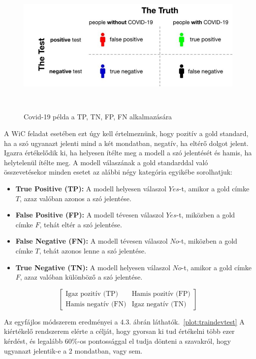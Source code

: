 \documentclass[12pt]{report}
\theoremstyle{definition}
\begin{document}
\begin{figure}[H]
	\centering
	\includegraphics[width=1\linewidth]{graphics/covid-tp-tn-fp-fn.png}
	\caption{Covid-19 példa a TP, TN, FP, FN alkalmazására}~\cite{manrai2020covid}
	\label{fig:enter-label3}
\end{figure}

A WiC feladat esetében ezt úgy kell értelmeznünk, hogy pozitív a gold standard, ha a szó ugyanazt jelenti mind a két mondatban, negatív, ha eltérő dolgot jelent. Igazra értékelődik ki, ha helyesen ítélte meg a modell a szó jelentését és hamis, ha helytelenül ítélte meg. A modell válaszának a gold standarddal való összevetésekor minden esetet az alábbi négy kategória egyikébe sorolhatjuk:
\begin{itemize}
	\item \textbf{True Positive (TP):} A modell helyesen válaszol $Yes$-t, amikor a gold címke $T$, azaz valóban azonos a szó jelentése.
	\item \textbf{False Positive (FP):} A modell tévesen válaszol $Yes$-t, miközben a gold címke $F$, tehát eltér a szó jelentése.
	\item \textbf{False Negative (FN):} A modell tévesen válaszol $No$-t, miközben a gold címke $T$, tehát azonos lenne a szó jelentése.
	\item \textbf{True Negative (TN):} A modell helyesen válaszol $No$-t, amikor a gold címke $F$, azaz valóban különböző a szó jelentése.
\end{itemize}

\begin{equation}
	\begin{bmatrix}
		\text{Igaz pozitív (TP)}  & \text{Hamis pozitív (FP)} \\
		\text{Hamis negatív (FN)} & \text{Igaz negatív (TN)}
	\end{bmatrix}
\end{equation}


Az egyfájlos módszerem eredményei a 4.3. ábrán láthatók.~\ref{plot:traindevtest}
A kiértékelő rendszerem elérte a célját, hogy gyorsan ki tud értékelni több ezer kérdést, és legalább 60\%-os pontossággal el tudja dönteni a szavakról, hogy ugyanazt jelentik-e a 2 mondatban, vagy sem.
\end{document}
